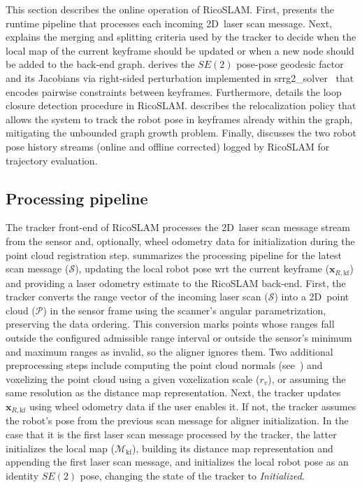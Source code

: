 This section describes the online operation of RicoSLAM.
First,  presents the runtime pipeline that
processes each incoming 2D~laser scan message.
Next,  explains the merging and
splitting criteria used by the tracker to decide when
the local map of the current keyframe should be updated or when
a new node should be added to the back-end graph.
 derives the $SE(2)$ pose-pose
geodesic factor and its Jacobians via right-sided perturbation implemented in
srrg2\_solver~\cite{grisetti:robotics:2020} that encodes pairwise constraints
between keyframes.
Furthermore,  details the loop closure
detection procedure in RicoSLAM.
 describes the relocalization policy that
allows the system to track the robot pose in keyframes already within the graph,
mitigating the unbounded graph growth problem.
Finally,  discusses the two robot pose
history streams (online and offline corrected) logged by RicoSLAM
for trajectory evaluation.

\subsection{Processing pipeline}\label{sec:slam:online:overview}

The tracker front-end of RicoSLAM processes the 2D~laser scan message stream
from the sensor and, optionally, wheel odometry data for initialization during
the point cloud registration step.  summarizes
the processing pipeline for the latest scan message ($\mathcal{S}$), updating
the local robot pose \gls{wrt} the current keyframe
($\mathbf{x}_{R,\mathrm{kf}}$) and providing a laser odometry estimate to
the RicoSLAM back-end. First, the tracker converts the range vector of the
incoming laser scan ($\mathcal{S}$) into a 2D~point cloud ($\mathcal{P}$) in the
sensor frame using the scanner's angular parametrization, preserving the data ordering.
This conversion marks points whose ranges fall outside the configured admissible
range interval or outside the sensor's minimum and maximum ranges as invalid,
so the aligner ignores them. Two additional preprocessing steps include
computing the point cloud normals
(see~) and voxelizing
the point cloud using a given voxelization scale ($r_v$), or assuming
the same resolution as the distance map representation.
Next, the tracker updates $\mathbf{x}_{R,\mathrm{kf}}$ using wheel odometry data
if the user enables it. If not, the tracker assumes the robot's pose from
the previous scan message for aligner initialization. In the case that it is
the first laser scan message processed by the tracker, the latter initializes
the local map ($\mathcal{M}_{\mathrm{kf}}$), building its distance map
representation and appending the first laser scan message, and initializes the
local robot pose as an identity $SE(2)$ pose, changing the state of
the tracker to \emph{Initialized}.

